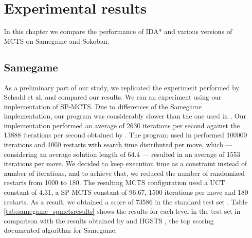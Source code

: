 \chapter{Experimental results}
\label{experiments}
In this chapter we compare the performance of IDA* and various versions of MCTS on Samegame and Sokoban.

\section{Samegame}
As a preliminary part of our study, we replicated the experiment performed by Schadd et al. \cite{DBLP:journals/kbs/SchaddWTU12} and compared our results. We ran an experiment using our implementation of SP-MCTS. Due to differences of the Samegame implementation, our program was considerably slower than the one used in \cite{DBLP:journals/kbs/SchaddWTU12}. Our implementation performed an average of 2630 iterations per second against the 13888 iterations per second obtained by \cite{DBLP:journals/kbs/SchaddWTU12}. The program used in \cite{DBLP:journals/kbs/SchaddWTU12} performed 100000 iterations and 1000 restarts with search time distributed per move, which --- considering an average solution length of 64.4 --- resulted in an average of 1553 iterations per move. We decided to keep execution time as a constraint instead of number of iterations, and to achieve that, we reduced the number of randomized restarts from 1000 to 180. The resulting MCTS configuration used a UCT constant of 4.31, a SP-MCTS constant of 96.67, 1500 iterations per move and 180 restarts. As a result, we obtained a score of 73586 in the standard test set \cite{highscore}. Table \ref{tab:samegame_spmctsresults} shows the results for each level in the test set in comparison with the results obtained by \cite{DBLP:journals/kbs/SchaddWTU12} and HGSTS \cite{Edelkamph}, the top scoring documented algorithm for Samegame.
